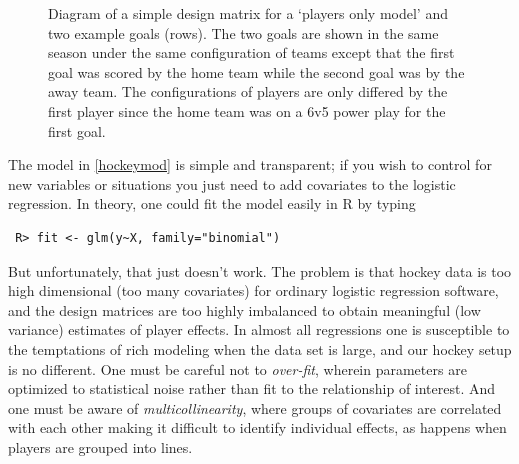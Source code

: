 \begin{figure}[hbt]
    \centering
    \caption{Diagram of a simple design matrix for a `players only model' and two example goals (rows). The two goals are shown in the same season under the same configuration of teams except that the first goal was scored by the home team while the second goal was by the away team. The configurations of players are only differed by the first player since the home team was on a 6v5 power play for the first goal. }\label{fig:data}
\end{figure}

The model in \ref{hockeymod} is simple and transparent; if you wish to
control for new variables or situations you just need to add covariates to the
logistic regression. In theory, one could fit the model easily in  {\sf R} by
typing \begin{verbatim} R> fit <- glm(y~X, family="binomial") \end{verbatim}
But unfortunately, that just doesn't work.   The problem is that hockey data
is too high dimensional (too many covariates) for ordinary logistic regression
software, and the design matrices are too highly imbalanced to obtain
meaningful (low variance) estimates of player effects.   In almost all
regressions one is susceptible to the temptations of rich modeling when the
data set is large, and our hockey setup is no different. One must be careful
not to {\em over-fit}, wherein parameters are optimized to statistical noise
rather than fit to the relationship of interest.  And one must be aware of
{\em multicollinearity}, where groups of covariates are correlated with each
other making it difficult to identify individual effects, as happens when
players are grouped into lines.  



